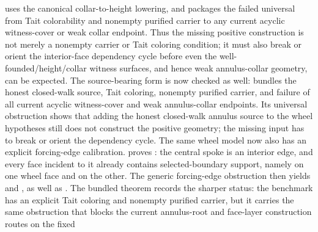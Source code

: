 \documentclass[11pt]{article}
\begin{document}
uses the canonical collar-to-height lowering, and
packages the failed universal from Tait colorability and nonempty purified
carrier to any current acyclic witness-cover or weak collar endpoint.  Thus the
missing positive construction is not merely a nonempty carrier or Tait coloring
condition; it must also break or orient the interior-face dependency cycle before
even the well-founded/height/collar witness surfaces, and hence weak
annulus-collar geometry, can be expected.
The source-bearing form is now checked as well:
bundles the honest closed-walk source, Tait coloring, nonempty purified
carrier, and failure of all current acyclic witness-cover and weak
annulus-collar endpoints.  Its universal obstruction
shows that adding the honest closed-walk annulus source to the wheel
hypotheses still does not construct the positive geometry; the missing input
has to break or orient the dependency cycle.
The same wheel model now also has an explicit forcing-edge calibration.
 proves
: the central spoke
 is an interior edge, and every face incident to it already
contains selected-boundary support, namely  on one wheel face and
 on the other.  The generic forcing-edge obstruction then yields
and
,
as well as
.
The bundled theorem
records the sharper status: the benchmark has an explicit Tait coloring and
nonempty purified carrier, but it carries the same obstruction that blocks the
current annulus-root and face-layer construction routes on the fixed
\end{document}
